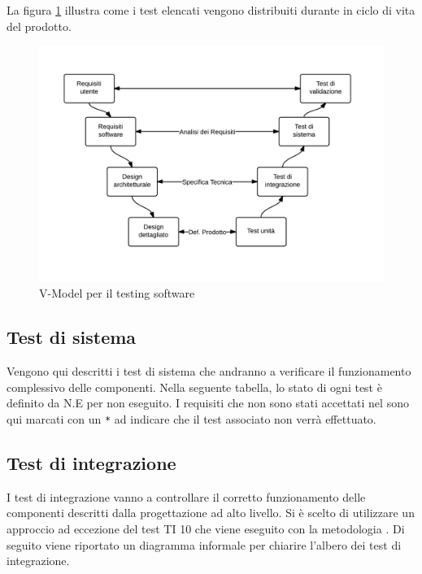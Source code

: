 	La figura \ref{fig:V-Model} illustra come i test elencati vengono distribuiti durante in ciclo di vita del prodotto.

	\begin{figure}[H]
	\centering \includegraphics[width=1\textwidth]{V-Model.png}
	\caption{V-Model per il testing software}
	\label{fig:V-Model}
	\end{figure}

	\subsection{Test di sistema}
	Vengono qui descritti i test di sistema che andranno a verificare il funzionamento complessivo delle componenti.
	Nella seguente tabella, lo stato di ogni test è definito da N.E per non eseguito. I requisiti che non sono stati accettati nel \AnalisiDeiRequisiti{} sono qui marcati con un \texttt{*} ad indicare che il test associato non verrà effettuato.
	
	
	
	\subsection{Test di integrazione}
	I test di integrazione vanno a controllare il corretto funzionamento delle componenti descritti dalla progettazione ad alto livello. Si è scelto di utilizzare un approccio  ad eccezione del test TI 10 che viene eseguito con la metodologia . Di seguito viene riportato un diagramma informale per chiarire l'albero dei test di integrazione.

